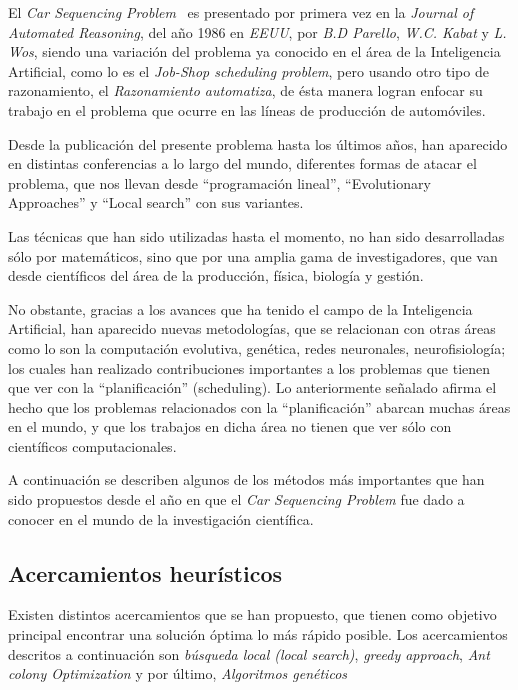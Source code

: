 El \emph{Car Sequencing Problem}~\cite{parello} es presentado por primera vez en la \emph{Journal of Automated Reasoning},
del año 1986 en \emph{EEUU}, por \emph{B.D Parello}, \emph{W.C. Kabat} y \emph{L. Wos}, siendo una variación
del problema ya conocido en el área de la Inteligencia Artificial, como lo es el \emph{Job-Shop scheduling problem},
pero usando otro tipo de razonamiento, el \emph{Razonamiento automatiza}, de ésta manera logran enfocar su trabajo
en el problema que ocurre en las líneas de producción de automóviles.

Desde la publicación del presente problema hasta los últimos años, han aparecido en distintas conferencias a lo largo
del mundo, diferentes formas de atacar el problema, que nos llevan desde  ``programación lineal'', ``Evolutionary Approaches''
y ``Local search'' con sus variantes.

Las técnicas que han sido utilizadas hasta el momento, no han sido desarrolladas sólo por matemáticos, sino que por una amplia
gama de investigadores, que van desde científicos del área de la producción, física, biología y gestión.

No obstante, gracias a los avances que ha tenido el campo de la Inteligencia Artificial, han aparecido nuevas metodologías,
que se relacionan con otras áreas como lo son la computación evolutiva, genética,  redes neuronales, neurofisiología;
los cuales han realizado contribuciones importantes a los problemas que tienen que ver con la ``planificación'' (scheduling).
Lo anteriormente señalado afirma el hecho que los problemas relacionados con la ``planificación'' abarcan muchas áreas en el mundo,
y que los trabajos en dicha área no tienen que ver sólo con científicos computacionales.

A continuación se describen algunos de los métodos más importantes que han sido propuestos desde el año
en que el \emph{Car Sequencing Problem} fue dado a conocer en el mundo de la investigación científica.


\subsection{Acercamientos heurísticos}
Existen distintos acercamientos que se han propuesto, que tienen como objetivo principal
encontrar una solución óptima lo más rápido posible.
Los acercamientos descritos a continuación son \emph{búsqueda local (local search)},
\emph{greedy approach}, \emph{Ant colony Optimization} y por último, \emph{Algoritmos genéticos}

